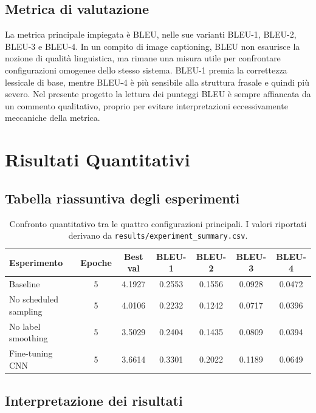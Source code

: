\documentclass[11pt,a4paper]{report}
\begin{document}
\section{Metrica di valutazione}

La metrica principale impiegata è BLEU, nelle sue varianti BLEU-1, BLEU-2, BLEU-3 e BLEU-4. In un compito di image captioning, BLEU non esaurisce la nozione di qualità linguistica, ma rimane una misura utile per confrontare configurazioni omogenee dello stesso sistema. BLEU-1 premia la correttezza lessicale di base, mentre BLEU-4 è più sensibile alla struttura frasale e quindi più severo. Nel presente progetto la lettura dei punteggi BLEU è sempre affiancata da un commento qualitativo, proprio per evitare interpretazioni eccessivamente meccaniche della metrica.

\chapter{Risultati Quantitativi}

\section{Tabella riassuntiva degli esperimenti}

\begin{table}[H]
\centering
\begin{tabular}{lcccccc}
\toprule
\textbf{Esperimento} & \textbf{Epoche} & \textbf{Best val} & \textbf{BLEU-1} & \textbf{BLEU-2} & \textbf{BLEU-3} & \textbf{BLEU-4} \\
\midrule
Baseline & 5 & 4.1927 & 0.2553 & 0.1556 & 0.0928 & 0.0472 \\
No scheduled sampling & 5 & 4.0106 & 0.2232 & 0.1242 & 0.0717 & 0.0396 \\
No label smoothing & 5 & 3.5029 & 0.2404 & 0.1435 & 0.0809 & 0.0394 \\
Fine-tuning CNN & 5 & 3.6614 & 0.3301 & 0.2022 & 0.1189 & 0.0649 \\
\bottomrule
\end{tabular}
\caption{Confronto quantitativo tra le quattro configurazioni principali. I valori riportati derivano da \texttt{results/experiment\_summary.csv}.}
\end{table}

\section{Interpretazione dei risultati}
\end{document}
